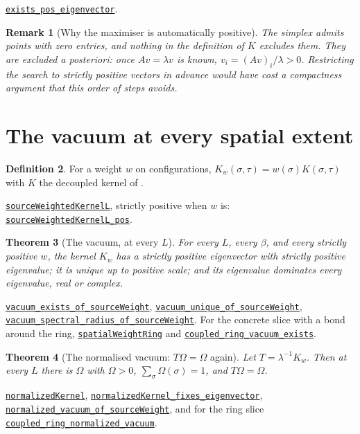 \documentclass[11pt]{article}
\newtheorem{theorem}{Theorem}[section]
\newtheorem{remark}[theorem]{Remark}
\theoremstyle{definition}
\newtheorem{definition}[theorem]{Definition}
\newcommand{\anchor}{08a9050201287a31d20fc4339cc5c6c64b1391fb}
\newcommand{\osline}[3]{%
  \href{https://github.com/lluiseriksson/THE-ERIKSSON-PROGRAMME/blob/\anchor/YangMills/OS/#1.lean\#L#2}{\nolinkurl{#3}}}
\newcommand{\Om}{\Omega}
\begin{document}
\osline{PerronKernel}{201}{exists\_pos\_eigenvector}.

\begin{remark}[Why the maximiser is automatically positive]
The simplex admits points with zero entries, and nothing in the definition of
$K$ excludes them.  They are excluded \emph{a posteriori}: once $Av=\lambda v$
is known, $v_i=(Av)_i/\lambda>0$.  Restricting the search to strictly positive
vectors in advance would have cost a compactness argument that this order of
steps avoids.
\end{remark}

\section{The vacuum at every spatial extent}

\begin{definition}
For a weight $w$ on configurations, $K_w(\sigma,\tau)=w(\sigma)K(\sigma,\tau)$
with $K$ the decoupled kernel of \cite{ErikssonSpatial}.
\end{definition}

\osline{PerronKernel}{388}{sourceWeightedKernelL}, strictly positive when $w$
is: \osline{PerronKernel}{392}{sourceWeightedKernelL\_pos}.

\begin{theorem}[The vacuum, at every $L$]\label{thm:vac}
For every $L$, every $\beta$, and every strictly positive $w$, the kernel $K_w$
has a strictly positive eigenvector with strictly positive eigenvalue; it is
unique up to positive scale; and its eigenvalue dominates every eigenvalue, real
or complex.
\end{theorem}

\osline{PerronKernel}{402}{vacuum\_exists\_of\_sourceWeight},
\osline{PerronKernel}{422}{vacuum\_unique\_of\_sourceWeight},
\osline{PerronKernel}{433}{vacuum\_spectral\_radius\_of\_sourceWeight}.
For the concrete slice with a bond around the ring,
\osline{PerronKernel}{445}{spatialWeightRing} and
\osline{PerronKernel}{454}{coupled\_ring\_vacuum\_exists}.

\begin{theorem}[The normalised vacuum: $T\Om=\Om$ again]\label{thm:norm}
Let $T=\lambda^{-1}K_w$.  Then at every $L$ there is $\Om$ with $\Om>0$,
$\sum_\sigma\Om(\sigma)=1$, and $T\Om=\Om$.
\end{theorem}

\osline{PerronKernel}{355}{normalizedKernel},
\osline{PerronKernel}{362}{normalizedKernel\_fixes\_eigenvector},
\osline{PerronKernel}{413}{normalized\_vacuum\_of\_sourceWeight}, and for
the ring slice
\osline{PerronKernel}{462}{coupled\_ring\_normalized\_vacuum}.
\end{document}
